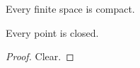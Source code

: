 \documentclass{amsart}
\begin{document}
\begin{theorem} Every finite space is compact. \end{theorem}
\begin{lemma} Every point is closed. \end{lemma}
\begin{proof} Clear. \end{proof}
\end{document}
